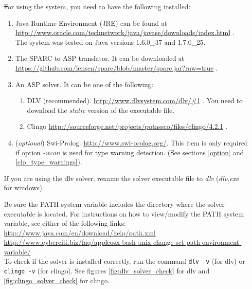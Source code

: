 \documentclass[12pt, letterpaper]{article}
\begin{document}
\st For using the system, you need to have the following installed:
\begin{enumerate}
\item Java Runtime Environment (JRE) can be found at \\
{\scriptsize
\url{http://www.oracle.com/technetwork/java/javase/downloads/index.html}
}.\\
The system was tested on Java versions 1.6.0\_37 and 1.7.0\_25.
\item The SPARC to ASP translator. It can be downloaded at \\ 
{\scriptsize
\url{https://github.com/iensen/sparc/blob/master/sparc.jar?raw=true}
}.
\item An ASP solver. It can be one of the following:
\begin{enumerate} 
\item DLV (recommended).
{\scriptsize
 \url{http://www.dlvsystem.com/dlv/#1}
}. You need to download the \textit{static} version of the executable file.
\item Clingo  {\scriptsize
 \url{http://sourceforge.net/projects/potassco/files/clingo/4.2.1}
}.
\end{enumerate}

\item (\textit{optional}) Swi-Prolog. {\scriptsize \url{http://www.swi-prolog.org/}}. This item is only required if option \textit{-wcon} is used for type warning detection.
(See sections \ref{option} and \ref{clp_type_warnings}).

\end{enumerate}
If you are using the dlv solver, rename the solver executable file to \textit{dlv} (\textit{dlv.exe} for windows).

Be sure the PATH system variable includes the directory where the solver executable is located. For instructions on how to view/modify the PATH system variable, see either of the following links:\\
{\scriptsize
\url{http://www.java.com/en/download/help/path.xml}\\
\url{http://www.cyberciti.biz/faq/appleosx-bash-unix-change-set-path-environment-variable/}\\
}
To check if the solver is installed correctly, run the command \texttt{dlv -v} (for dlv) or \\ \texttt{clingo -v} (for clingo). See figures \ref{fig:dlv_solver_check} for dlv and \ref{fig:clingo_solver_check} for clingo.
\end{document}
